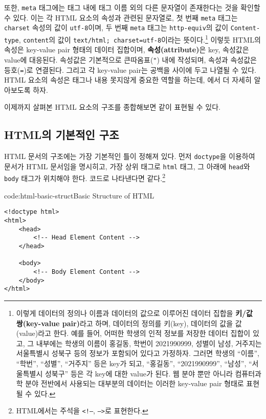 또한, \texttt{meta} 태그에는 태그 내에 태그 이름 외의 다른 문자열이 존재한다는 것을 확인할 수 있다. 이는 각 HTML 요소의 속성과 관련된 문자열로, 첫 번째 \texttt{meta} 태그는 \texttt{charset} 속성의 값이 \texttt{utf-8}이며, 두 번째 \texttt{meta} 태그는 \texttt{http-equiv}의 값이 \texttt{Content-type}, \texttt{content}의 값이 \verb|text/html; charset=utf-8|이라는 뜻이다.\footnote{이렇게 데이터의 정의나 이름과 데이터의 값으로 이루어진 데이터 집합을 \textbf{키/값 쌍(key-value pair)}라고 하며, 데이터의 정의를 키(key), 데이터의 값을 값(value)라고 한다. 예를 들어, 어떠한 학생의 인적 정보를 저장한 데이터 집합이 있고, 그 내부에는 학생의 이름이 홍길동, 학번이 2021990999, 성별이 남성, 거주지는 서울특별시 성북구 등의 정보가 포함되어 있다고 가정하자. 그러면 학생의 ``이름'', ``학번'', ``성별'', ``거주지'' 등은 key가 되고, ``홍길동'', ``2021990999'', ``남성'', ``서울특별시 성북구'' 등은 각 key에 대한 value가 된다. 웹 분야 뿐만 아니라 컴퓨터과학 분야 전반에서 사용되는 대부분의 데이터는 이러한 key-value pair 형태로 표현될 수 있다.} 이렇듯 HTML의 속성은 key-value pair 형태의 데이터 집합이며, \textbf{속성(attribute)}은 key, 속성값은 value에 대응된다. 속성값은 기본적으로 큰따옴표(\texttt{"}) 내에 작성되며, 속성과 속성값은 등호(\texttt{=})로 연결된다. 그리고 각 key-value pair는 공백을 사이에 두고 나열될 수 있다. HTML 요소의 속성은 태그나 내용 못지않게 중요한 역할을 하는데, 에서 더 자세히 알아보도록 하자.

이제까지 살펴본 HTML 요소의 구조를 종합해보면 \와 같이 표현될 수 있다.

    {}

\subsection*{HTML의 기본적인 구조}
HTML 문서의 구조에는 가장 기본적인 틀이 정해져 있다. 먼저 \texttt{doctype}을 이용하여 문서가 HTML 문서임을 명시히고, 가장 상위 태그로 \texttt{html} 태그, 그 아래에 \texttt{head}와 \texttt{body} 태그가 위치해야 한다. 코드로 나타낸다면 \와 같다.\footnote{HTML에서는 주석을 \texttt{<!--}, \texttt{-->}로 표현한다.}

\begin{codeenv}{code:html-basic-struct}{Basic Structure of HTML}
\begin{verbatim}
<!doctype html>
<html>
    <head>
        <!-- Head Element Content -->
    </head>

    <body>
        <!-- Body Element Content -->
    </body>
</html>
\end{verbatim}
\end{codeenv}

